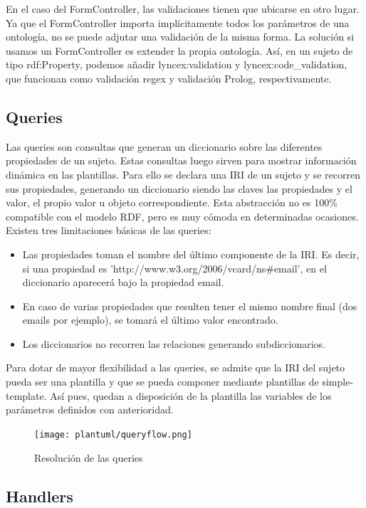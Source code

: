 \documentclass[12pt]{report} %
\begin{document}
En el caso del FormController, las validaciones tienen que ubicarse en otro lugar. Ya que el FormController importa implícitamente todos los parámetros de una ontología, no se puede adjutar una validación de la misma forma.
La solución si usamos un FormController es extender la propia ontología.
Así, en un sujeto de tipo rdf:Property, podemos añadir lyncex:validation y lyncex:code\_validation, que funcionan como validación regex y validación Prolog, respectivamente.

\subsection{Queries}

Las queries son consultas que generan un diccionario sobre las diferentes propiedades de un sujeto. Estas consultas luego sirven para mostrar información dinámica en las plantillas. Para ello se declara una IRI de un sujeto y se recorren sus propiedades, generando un diccionario siendo las claves las propiedades y el valor, el propio valor u objeto correspondiente. Esta abstracción no es 100\% compatible con el modelo RDF, pero es muy cómoda en determinadas ocasiones. Existen tres limitaciones básicas de las queries:
\begin{itemize}
    \item Las propiedades toman el nombre del último componente de la IRI. Es decir, si una propiedad es 'http://www.w3.org/2006/vcard/ns\#email', en el diccionario aparecerá bajo la propiedad email.
    \item En caso de varias propiedades que resulten tener el mismo nombre final (dos emails por ejemplo), se tomará el último valor encontrado.
    \item Los diccionarios no recorren las relaciones generando subdiccionarios.
\end{itemize}

Para dotar de mayor flexibilidad a las queries, se admite que la IRI del sujeto pueda ser una plantilla y que se pueda componer mediante plantillas de simple-template. Así pues, quedan a disposición de la plantilla las variables de los parámetros definidos con anterioridad.

\begin{figure}
    \centering
    \texttt{[image: plantuml/queryflow.png]}
    \caption{Resolución de las queries}
    \label{fig:queryflow}
\end{figure}

\subsection{Handlers}
\end{document}
